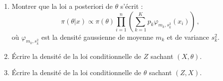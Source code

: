 \documentclass[a4paper,10pt,fleqn]{article}
\newcommand{\1}{\ensuremath{\mathbbm{1}}}
\begin{document}
\begin{enumerate}
\item Montrer que la loi a posteriori de $\theta$ s'\'ecrit :
$$
\pi(\theta|x) \propto \pi(\theta)\prod_{i=1}^n\left(\sum_{k=1}^Kp_k \varphi_{m_k,s_k^2}(x_i)\right)\,,
$$
o\`u $\varphi_{m_k,s_k^2}$ est la densit\'e gaussienne de moyenne $m_k$ et de variance $s_k^2$.

%
\item \'Ecrire la densit\'e de la loi conditionnelle de $Z$ sachant $(X,\theta)$.

%
\item \'Ecrire la densit\'e de la loi conditionnelle de $\theta$ sachant $(Z,X)$.


\end{enumerate}
\end{document}

